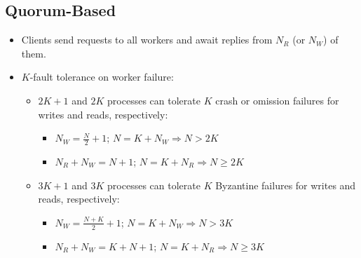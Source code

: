 \subsection{Quorum-Based}
\begin{itemize}
    \item Clients send requests to all workers and await replies from $N_{R}$ (or $N_{W}$) of them.
    
    \item \( K \)-fault tolerance on worker failure:
    \begin{itemize}
        \item \( 2K + 1 \) and \( 2K \) processes can tolerate \( K \) crash or omission failures for writes and reads, respectively:
    \begin{itemize}
        \item \( N_W = \frac{N}{2} + 1 \); \( N = K + N_W \Rightarrow N > 2K \)
        \item \( N_R + N_W = N + 1 \); \( N = K + N_R \Rightarrow N \geq 2K \)
    \end{itemize}
    
    \item \( 3K + 1 \) and \( 3K \) processes can tolerate \( K \) Byzantine failures for writes and reads, respectively:

    \begin{itemize}
        \item \( N_W = \frac{N + K}{2} + 1 \); \( N = K + N_W \Rightarrow N > 3K \)
        \item \( N_R + N_W = K + N + 1 \); \( N = K + N_R \Rightarrow N \geq 3K \)
    \end{itemize}
    \end{itemize}
\end{itemize}

